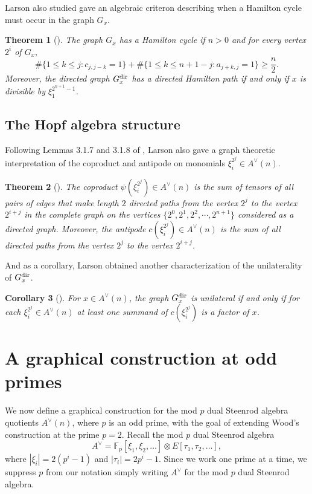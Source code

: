 \documentclass{amsart}
\newtheorem{theorem}{Theorem}[section]
\newtheorem{cor}[theorem]{Corollary}
\theoremstyle{definition}
\theoremstyle{plain}
\numberwithin{theorem}{section}
\numberwithin{equation}{section}
\numberwithin{figure}{section}
\newcommand{\mF}{{\mathbb F}}
\newcommand{\0}{\langle 0 \rangle }
\begin{document}
Larson also studied gave an algebraic criteron describing when a Hamilton cycle must occur in the graph $G_x$. 
\begin{theorem}[{\cite[Theorem 1.4]{Larson22}}]
    The graph $G_x$ has a Hamilton cycle if $n > 0$ and for every vertex $2^i$ of $G_x,$ 
    \[
    \# \{ 1 \leq k \leq j : c_{j, j - k} = 1  \} + \# \{1 \leq k \leq n + 1 - j : a_{j + k, j} = 1 \} \geq \frac{n}{2}.
    \]
    Moreover, the directed graph $G_x^\textup{dir}$ has a directed Hamilton path if and only if $x$ is divisible by $\xi_1^{2^{n + 1} - 1}$.
\end{theorem}

\subsection{The Hopf algebra structure }
Following Lemmas 3.1.7 and 3.1.8 of \cite{Yearwood19}, Larson also gave a graph theoretic interpretation of the coproduct and antipode on monomials $\xi_i^{2^j} \in A^\vee(n)$. 
\begin{theorem}[{\cite[Theorem 1.5]{Larson22}}] \label{thm:LarsonCoproduct}
    The coproduct $\psi(\xi_i^{2^j}) \in A^\vee(n)$ is the sum of tensors of all pairs of edges that make length $2$ directed paths from the vertex $2^j$ to the vertex $2^{i +j}$ 
     in the complete graph on the vertices $\{2^0, 2^1, 2^2, \cdots, 2^{n + 1}\}$ considered as a directed graph\color{black}. Moreover, the antipode $c(\xi_i^{2^j}) \in A^\vee(n)$ is the sum of all directed paths from the vertex $2^j$ to the vertex $2^{i + j}$. 
\end{theorem}
And as a corollary, Larson obtained another characterization of the unilaterality of $G_x^\textup{dir}$. 
\begin{cor}[{\cite[Corollary 1.6]{Larson22}}]
    For $x \in A^\vee(n)$, the graph $G_x^\textup{dir}$ is unilateral if and only if for each $\xi_i^{2^j} \in A^\vee (n)$ at least one summand of $c(\xi_i^{2^j})$ is a factor of $x$. 
\end{cor}

\section{A graphical construction at odd primes} \label{sec:oddprimes}

We now define a graphical construction for the mod $p$ dual Steenrod algebra quotients $A^\vee(n)$, where $p$ is an odd prime, with the goal of extending Wood's construction at the prime $p = 2$. Recall the mod $p$ dual Steenrod algebra
$$A^\vee
=\mF_p[\xi_1,\xi_2,\dots]\otimes E[\tau_1,\tau_2,\dots],$$ where $|\xi_i|=2(p^i-1)$ and $|\tau_i|=2p^i-1$. Since we work one prime at a time, we suppress $p$ from our notation simply writing $A^\vee$ for the mod $p$ dual Steenrod algebra. 
\end{document}

